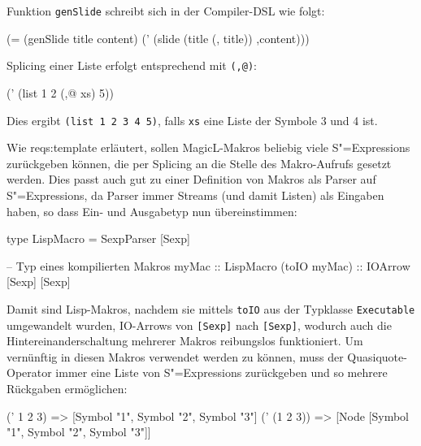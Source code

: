 \documentclass[12pt, a4paper, bibgerm]{scrbook}
\newenvironment{DIFnomarkup}{}{}
\newcommand\icode[1]{\lstinline?#1?}
\newcommand\sref{}
\newcommand{\sexps}{S"=Expressions}
\begin{document}
Funktion \icode{genSlide} schreibt sich in der Compiler-DSL wie folgt:
\begin{DIFnomarkup}\begin{code}
(= (genSlide title content)
   (' (slide (title (, title)) ,content)))
\end{code}\end{DIFnomarkup}
Splicing einer Liste erfolgt entsprechend mit \icode{(,@)}:
\begin{DIFnomarkup}\begin{code}
(' (list 1 2 (,@ xs) 5))
\end{code}\end{DIFnomarkup}
Dies ergibt \icode{(list 1 2 3 4 5)}, falls \icode{xs} eine Liste der Symbole
3 und 4 ist.

Wie \sref{reqs:template} erläutert, sollen MagicL-Makros beliebig viele
\sexps{} zurückgeben können, die per Splicing an die Stelle des
Makro-Aufrufs gesetzt werden. Dies passt auch gut zu einer Definition
von Makros als Parser auf \sexps{}, da Parser immer Streams (und damit
Listen) als Eingaben haben, so dass Ein- und Ausgabetyp nun
übereinstimmen:
\begin{DIFnomarkup}\begin{code}
type LispMacro = SexpParser [Sexp]

-- Typ eines kompilierten Makros
myMac        :: LispMacro
(toIO myMac) :: IOArrow [Sexp] [Sexp]
\end{code}\end{DIFnomarkup}
Damit sind Lisp-Makros, nachdem sie mittels \icode{toIO} aus der Typklasse
\icode{Executable} umgewandelt wurden, IO-Arrows von \icode{[Sexp]} nach
\icode{[Sexp]}, wodurch auch die Hintereinanderschaltung mehrerer
Makros reibungslos funktioniert. Um vernünftig in diesen Makros
verwendet werden zu können, muss der Quasiquote-Operator immer eine
Liste von \sexps{} zurückgeben und so mehrere Rückgaben ermöglichen:
\begin{DIFnomarkup}\begin{code}
(' 1 2 3)     =>   [Symbol "1", Symbol "2", Symbol "3"]
(' (1 2 3))   =>   [Node [Symbol "1", Symbol "2", Symbol "3"]]
\end{code}\end{DIFnomarkup}
\end{document}

